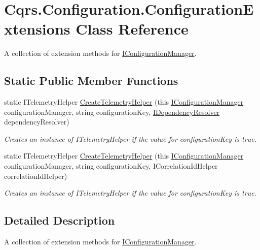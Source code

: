 \hypertarget{classCqrs_1_1Configuration_1_1ConfigurationExtensions}{}\section{Cqrs.\+Configuration.\+Configuration\+Extensions Class Reference}
\label{classCqrs_1_1Configuration_1_1ConfigurationExtensions}


A collection of extension methods for \hyperlink{interfaceCqrs_1_1Configuration_1_1IConfigurationManager}{I\+Configuration\+Manager}.  


\subsection*{Static Public Member Functions}
\begin{DoxyCompactItemize}
\item 
static I\+Telemetry\+Helper \hyperlink{classCqrs_1_1Configuration_1_1ConfigurationExtensions_aea6ef58f3c312c44a96985c033e7a9ae_aea6ef58f3c312c44a96985c033e7a9ae}{Create\+Telemetry\+Helper} (this \hyperlink{interfaceCqrs_1_1Configuration_1_1IConfigurationManager}{I\+Configuration\+Manager} configuration\+Manager, string configuration\+Key, \hyperlink{interfaceCqrs_1_1Configuration_1_1IDependencyResolver}{I\+Dependency\+Resolver} dependency\+Resolver)
\begin{DoxyCompactList}\small\item\em Creates an instance of I\+Telemetry\+Helper if the value for {\itshape configuration\+Key}  is true. \end{DoxyCompactList}\item 
static I\+Telemetry\+Helper \hyperlink{classCqrs_1_1Configuration_1_1ConfigurationExtensions_a5b4906550efcc42fd0904c23bd7ae685_a5b4906550efcc42fd0904c23bd7ae685}{Create\+Telemetry\+Helper} (this \hyperlink{interfaceCqrs_1_1Configuration_1_1IConfigurationManager}{I\+Configuration\+Manager} configuration\+Manager, string configuration\+Key, I\+Correlation\+Id\+Helper correlation\+Id\+Helper)
\begin{DoxyCompactList}\small\item\em Creates an instance of I\+Telemetry\+Helper if the value for {\itshape configuration\+Key}  is true. \end{DoxyCompactList}\end{DoxyCompactItemize}


\subsection{Detailed Description}
A collection of extension methods for \hyperlink{interfaceCqrs_1_1Configuration_1_1IConfigurationManager}{I\+Configuration\+Manager}. 



